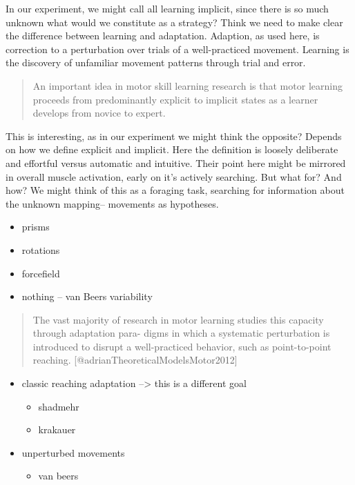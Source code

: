 \documentclass[../main.tex]{subfiles}
\begin{document}
In our experiment, we might call all learning implicit, since there is so much unknown what would we constitute as a strategy? Think we need to make clear the difference between learning and adaptation. Adaption, as used here, is correction to a perturbation over trials of a well-practiced movement. Learning is the discovery of unfamiliar movement patterns through trial and error.

\begin{quote}
An important idea in motor skill learning research is that motor learning proceeds from predominantly explicit to implicit states as a learner develops from novice to expert.
\end{quote}

This is interesting, as in our experiment we might think the opposite? Depends on how we define explicit and implicit. Here the definition is loosely deliberate and effortful versus automatic and intuitive. Their point here might be mirrored in overall muscle activation, early on it's actively searching. But what for? And how? We might think of this as a foraging task, searching for information about the unknown mapping-- movements as hypotheses.

\begin{itemize}
\tightlist
\item
  prisms
\item
  rotations
\item
  forcefield
\item
  nothing -- van Beers variability
\end{itemize}

\begin{quote}
The vast majority of research in motor learning studies this capacity through adaptation para- digms in which a systematic perturbation is introduced to disrupt a well-practiced behavior, such as point-to-point reaching. {[}@adrianTheoreticalModelsMotor2012{]}
\end{quote}

\begin{itemize}
\tightlist
\item
  classic reaching adaptation --\textgreater{} this is a different goal

  \begin{itemize}
  \tightlist
  \item
    shadmehr
  \item
    krakauer
  \end{itemize}
\item
  unperturbed movements

  \begin{itemize}
  \tightlist
  \item
    van beers
  \end{itemize}
\end{itemize}
\end{document}
